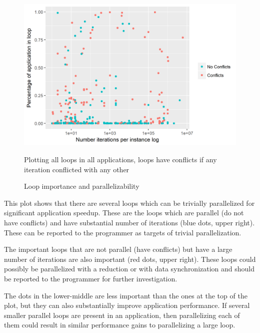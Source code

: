 \documentclass[12pt,twoside]{reedthesis}
\begin{document}
		\begin{figure}
			\caption{Loop importance and parallelizability}
			\label{fig:size-iteration-plots}
			
			\begin{minipage}{0.73\textwidth} %
				\includegraphics[scale=0.7]{plots/size_iteration_plot.png}
				{\footnotesize Plotting all loops in all applications, loops have conflicts if any iteration conflicted with any other\par}
			\end{minipage}
		\end{figure}
		
		This plot shows that there are several loops which can be trivially parallelized for significant application speedup. 
		These are the loops which are parallel (do not have conflicts) and have substantial number of iterations (blue dots, upper right). These can be reported to the programmer as targets of trivial parallelization. 
		
		The important loops that are not parallel (have conflicts) but have a large number of iterations are also important (red dots, upper right). These loops could possibly be parallelized with a reduction or with data synchronization and should be reported to the programmer for further investigation.
		
		The dots in the lower-middle are less important than the ones at the top of the plot, but they can also substantially improve application performance. If several smaller parallel loops are present in an application, then parallelizing each of them could result in similar performance gains to parallelizing a large loop. %
		
\end{document}
